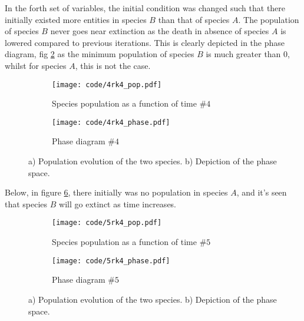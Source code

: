 \documentclass[a4paper]{article}
\newcommand{\newparagraph}{\vspace{.5cm}\noindent}
\begin{document}
\newparagraph
In the forth set of variables, the initial condition was changed such that there initially existed more entities in species $B$ than that of species $A$. The population of species $B$ never goes near extinction as the death in absence of species $A$ is lowered compared to previous iterations. This is clearly depicted in the phase diagram, fig \ref{fig: param 4 phase} as the minimum population of species $B$ is much greater than 0, whilst for species $A$, this is not the case.
\begin{figure}[H]
    \centering
    \begin{subfigure}{0.45\textwidth}
        \texttt{[image: code/4rk4\_pop.pdf]}
        \caption{Species population as a function of time $\#4$}
        \label{fig: param 4 pop}
    \end{subfigure}
    \hfill    
    \begin{subfigure}{0.45\textwidth}
        \texttt{[image: code/4rk4\_phase.pdf]}
        \caption{Phase diagram $\#4$}
        \label{fig: param 4 phase}
    \end{subfigure}
    \caption{a) Population evolution of the two species. b) Depiction of the phase space.}
    \label{fig: param 4}
\end{figure}\noindent
Below, in figure \ref{fig: param 5}, there initially was no population in species $A$, and it's seen that species $B$ will go extinct as time increases.
\begin{figure}[H]
    \centering
    \begin{subfigure}{0.45\textwidth}
        \texttt{[image: code/5rk4\_pop.pdf]}
        \caption{Species population as a function of time $\#5$}
        \label{fig: param 5 pop}
    \end{subfigure}
    \hfill    
    \begin{subfigure}{0.45\textwidth}
        \texttt{[image: code/5rk4\_phase.pdf]}
        \caption{Phase diagram $\#5$}
        \label{fig: param 5 phase}
    \end{subfigure}
    \caption{a) Population evolution of the two species. b) Depiction of the phase space.}
    \label{fig: param 5}
\end{figure}
\end{document}
